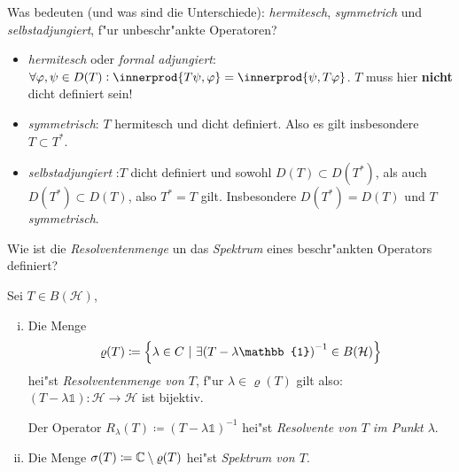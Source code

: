 \documentclass[9pt]{article}
\newcommand{\C}[1]{%
	\ifthenelse{\equal{#1}{}}
	{\mathbb{C}}
	{\mathbb{C}^{#1}}}%
\DeclarePairedDelimiter{\innerprod}\langle\rangle
\newcommand{\Hi}{\mathcal{H}}
\newcommand{\id}{\mathbb{1}}
\newcommand{\inv}{^{-1}}
\newenvironment{field}{}{\newpage}
\newif\ifnote
\newenvironment{note}{\notetrue}{\notefalse}
\newcommand{\localtag}{}
\newcommand{\globaltag}{}
\newcommand{\uuid}{}
\newcommand{\tags}[1]{
    \ifnote 
        \renewcommand{\localtag}{#1}
    \else
        \renewcommand{\globaltag}{#1}
    \fi 
    }
\newcommand{\xplain}[1]{\renewcommand{\uuid}{#1}}
\begin{document}
	\begin{note}
		\xplain{21f44b91-9d51-45bb-b869-36f9fbb8415b}
		\tags{6.2.9}
		
		\begin{field}  %
			Was bedeuten (und was sind die Unterschiede): \textit{hermitesch}, \textit{symmetrich} und \textit{selbstadjungiert}, f"ur unbeschr"ankte Operatoren?
			
		\end{field}
		
		\begin{field}  %
			\begin{itemize}
				\item \textit{hermitesch} oder \textit{formal adjungiert}: $\forall \varphi, \psi \in D(T): \innerprod{T\psi,\varphi}
				= \innerprod{\psi, T\varphi}$. $T$ muss hier \textbf{nicht} dicht definiert sein!
				\item \textit{symmetrisch}: $T$ hermitesch und dicht definiert. Also es gilt insbesondere $T\subset T^*$.
				\item \textit{selbstadjungiert} :$T$ dicht definiert und sowohl $D(T)\subset D(T^*)$, als auch $D(T^*) \subset D(T)$,
				also $T^*=T$ gilt. Insbesondere $D(T^*) = D(T)$ und $T$ \textit{symmetrisch}.
				
			\end{itemize}
		\end{field}
	\end{note}
	\begin{note}
		\xplain{e1ec3a29-1efb-4c61-8604-06bf284919cf}
		\tags{6.3, spektrum}
		
		\begin{field}  %
			Wie ist die \textit{Resolventenmenge} un das \textit{Spektrum} eines beschr"ankten Operators definiert?
		\end{field}
		
		\begin{field}  %
			Sei $T \in B(\Hi)$,
			\begin{enumerate}[i)]
				\item Die Menge 
				\begin{equation*}
					\varrho(T) \coloneqq \qty{\lambda \in C{} \ | \ \exists \qty(T-\lambda \id)\inv \in B(\Hi)}
				\end{equation*}
				hei"st \textit{Resolventenmenge von $T$}, f"ur $\lambda \in \varrho(T)$ gilt also: 
				$(T-\lambda \id): \Hi \rightarrow \Hi$ ist bijektiv.
				
				Der Operator $R_\lambda(T) \coloneqq(T-\lambda\id)\inv$ hei"st \textit{Resolvente von $T$ im Punkt $\lambda$}.
				\item Die Menge $\sigma(T)\coloneqq \C{}\setminus\varrho(T)$ hei"st \textit{Spektrum von $T$}.
			\end{enumerate}
		\end{field}
	\end{note}
\end{document}
